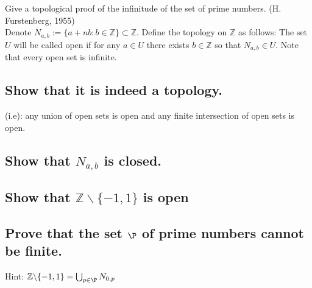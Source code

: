 \documentclass[]{article}
\newcommand{\Z}{\mathbb{Z}}
\begin{document}
\newpage
\section{}
Give a topological proof of the infinitude of the set of prime numbers. (H. Furstenberg, 1955)\\
Denote $N_{a,b} := \{a + nb : b \in \Z\} \subset \Z$. Define the topology on $\Z$ as follows: 
The set $U$ will be called open if for any $a \in U$ there exists $b \in \Z$ so that 
$N_{a,b} \in U$. Note that every open set is infinite.

\subsection{Show that it is indeed a topology.}
(i.e): any union of open sets is open and any finite intersection of open sets is open.



\subsection{Show that $N_{a,b}$ is closed.}



\subsection{Show that $\Z \backslash \{-1,1\}$ is open}




\subsection{Prove that the set $\P$ of prime numbers cannot be finite.}
Hint: $\Z \backslash \{-1,1\} = \bigcup_{p \in \P} N_{0,p}$
\end{document}

